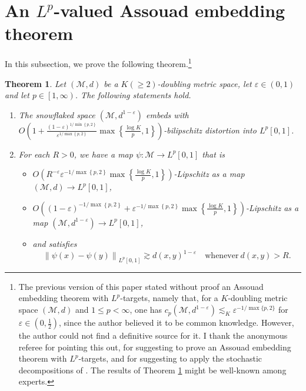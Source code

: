 \documentclass[11pt,reqno]{amsart}
\newtheorem{theorem}{Theorem}
\newcommand{\1}{\mathbf 1}
\begin{document}
\section{An $L^p$-valued Assouad embedding theorem}\label{app:assouad}
In this subsection, we prove the following theorem.\footnote{The previous version of this paper stated without proof an Assouad embedding theorem with $L^p$-targets, namely that, for a $K$-doubling metric space $\left(\mathcal{M},d\right)$ and $1\le p<\infty$, one has $c_p\left(\mathcal{M},d^{1-\varepsilon}\right)\lesssim_K \varepsilon^{-1/\max\{p,2\}}$ for $\varepsilon\in \left(0,\frac 12\right)$, since the author believed it to be common knowledge. However, the author could not find a definitive source for it. I thank the anonymous referee for pointing this out, for suggesting to prove an Assouad embedding theorem with $L^p$-targets, and for suggesting to apply the stochastic decompositions of \cite{lee2005extending}. The results of Theorem \ref{thm:lp-assouad} might be well-known among experts.}
\begin{theorem}\label{thm:lp-assouad}
    Let $\left(\mathcal{M},d\right)$ be a $K\left(\ge 2\right)$-doubling metric space, let $\varepsilon\in \left(0,1\right)$ and let $p\in \left[1,\infty\right)$. The following statements hold.
    \begin{enumerate}
    \item The snowflaked space $\left(\mathcal{M},d^{1-\varepsilon}\right)$ embeds with $O\left(1+\frac{(1-\varepsilon)^{1/\min\left\{p,2\right\}}}{\varepsilon^{1/\max\left\{p,2\right\}}}\max\left\{\frac{\log K}{p},1\right\}\right)$-bilipschitz distortion into $L^p[0,1]$.
    \item For each $R>0$, we have a map $\psi:\mathcal{M}\to L^p[0,1]$ that is
    \begin{itemize}
    \item $O\left(R^{-\varepsilon}\varepsilon^{-1/\max\left\{p,2\right\}}\max\left\{\frac{\log K}{p},1\right\}\right)$-Lipschitz as a map $(\mathcal{M},d)\to L^p[0,1]$,
    \item $O\left(\left(1-\varepsilon\right)^{-1/\max\left\{p,2\right\}}+\varepsilon^{-1/\max\left\{p,2\right\}}\max\left\{\frac{\log K}{p},1\right\}\right)$-Lipschitz as a map $(\mathcal{M},d^{1-\varepsilon})\to L^p[0,1]$,
    \item and satisfies
\begin{equation}\label{eq:large-scale-holder-lower-bound}
\left\|\psi\left(x\right)-\psi\left(y\right)\right\|_{L^p[0,1]}\gtrsim d\left(x,y\right)^{1-\varepsilon} \quad \mathrm{whenever}~d\left(x,y\right)>R.
\end{equation}
\end{itemize}
    \end{enumerate}
\end{theorem}
\end{document}
